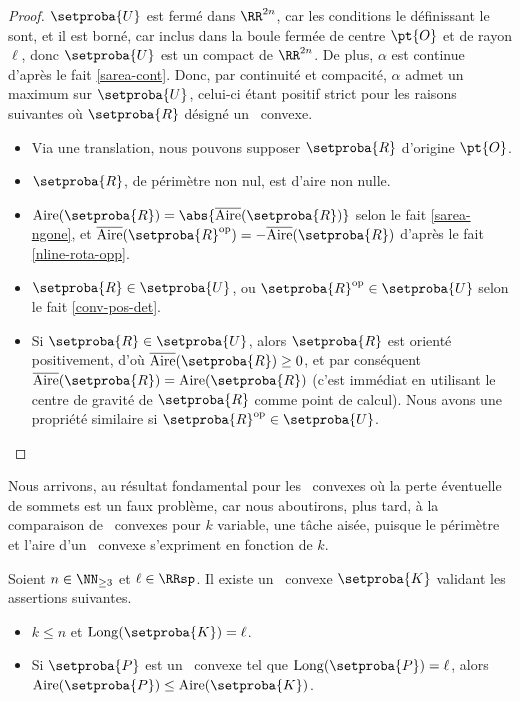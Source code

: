 \begin{proof}
     $\setproba{U}$ est fermé dans $\RR^{2n}$, car les conditions le définissant le sont, et il est borné, car inclus dans la boule fermée de centre $\pt{O}$ et de rayon $\ell$,
     donc $\setproba{U}$ est un compact de $\RR^{2n}$.
     De plus, $\alpha$ est continue d'après le fait \ref{sarea-cont}.
     Donc, par continuité et compacité, $\alpha$ admet un maximum sur $\setproba{U}$, celui-ci étant positif strict pour les raisons suivantes où $\setproba{R}$ désigné un \nreg\ convexe.
    \begin{itemize}
		\item Via une translation, nous pouvons supposer $\setproba{R}$ d'origine $\pt{O}$.


        \item $\setproba{R}$, de périmètre non nul, est d'aire non nulle.

        \item $\area{\setproba{R}} = \abs{\sarea{\setproba{R}}}$
		selon le fait \ref{sarea-ngone},
		et
		$\sarea{\setproba{R}^{\mathrm{op}}} = - \sarea{\setproba{R}}$ d'après le fait \ref{nline-rota-opp}.
		
		\item $\setproba{R} \in \setproba{U}$, ou $\setproba{R}^{\mathrm{op}} \in \setproba{U}$ selon le fait \ref{conv-pos-det}.
		
		\item Si $\setproba{R} \in \setproba{U}$, alors 
		$\setproba{R}$ est orienté positivement, 
		d'où $\sarea{\setproba{R}} \geq 0$, 
		et par conséquent $\sarea{\setproba{R}} = \area{\setproba{R}}$ 
		(c'est immédiat en utilisant le centre de gravité de $\setproba{R}$ comme point de calcul). 
		Nous avons une propriété similaire si $\setproba{R}^{\mathrm{op}} \in \setproba{U}$.
    \end{itemize}

	\null\vspace{-6ex}
\end{proof}




Nous arrivons, au résultat fondamental pour les \ngones\ convexes où la perte éventuelle de sommets est un faux problème, car nous aboutirons, plus tard, à la comparaison de \kregs\ convexes pour $k$ variable, une tâche aisée, puisque le périmètre et l'aire d'un \kreg\ convexe s'expriment en fonction de $k$.


\begin{fact} \label{at-least-one-kgone}
    Soient $n \in \NN_{\geq3}$ et $\ell \in \RRsp$.
    Il existe un \kgone\ convexe $\setproba{K}$ validant les assertions suivantes.
	\begin{itemize}
		\item $k \leq n$ et $\cyclelen{\setproba{K}} = \ell$.

		\item Si $\setproba{P}$ est un \ngone\ convexe tel que $\cyclelen{\setproba{P}} = \ell$, alors $\area{\setproba{P}} \leq \area{\setproba{K}}$.
    \end{itemize}
\end{fact}


